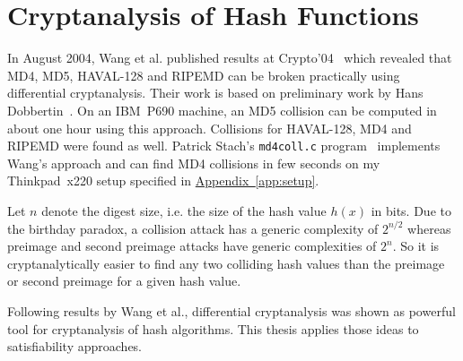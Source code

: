 \section{Cryptanalysis of Hash Functions}
\label{sec:intro-cryptanalysis}
%
In August 2004, Wang et al. published results at Crypto'04~\cite{wang2004} which revealed
that MD4, MD5, HAVAL-128 and RIPEMD can be broken practically using differential cryptanalysis.
Their work is based on preliminary work by Hans Dobbertin~\cite{Dobbertin1998}.
On an IBM~P690 machine, an MD5 collision can be computed in about one hour using this approach.
Collisions for HAVAL-128, MD4 and RIPEMD were found as well. Patrick Stach's \texttt{md4coll.c}
program~\cite{md4coll} implements Wang's approach and can find MD4 collisions in few seconds
on my Thinkpad~x220 setup specified in \hyperref[app:setup]{Appendix~\ref{app:setup}}.

Let $n$ denote the digest size, i.e. the size of the hash value $h(x)$ in bits.
Due to the birthday paradox, a collision attack has a generic complexity of $2^{n/2}$
whereas preimage and second preimage attacks have generic complexities of $2^n$.
So it is cryptanalytically easier to find any two colliding hash values than the
preimage or second preimage for a given hash value.

Following results by Wang et al., differential cryptanalysis was shown as
powerful tool for cryptanalysis of hash algorithms. This thesis applies those
ideas to satisfiability approaches.

